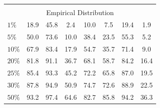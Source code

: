 \begin{center}
\begin{tabular*}{\textwidth}{@{\extracolsep{\fill}}lccccccc}
 \multicolumn{8}{c}{}\\ 
 \multicolumn{8}{c}{Empirical Distribution}\\ 
 \midrule 
$1\%$   & 18.9& 45.8& 2.4& 10.0& 7.5& 19.4& 1.9\\ 
$5\%$   & 50.0& 73.6& 10.0& 38.4& 23.5& 55.3& 5.2\\ 
$10\%$  & 67.9& 83.4& 17.9& 54.7& 35.7& 71.4& 9.0\\ 
$20\%$  & 81.8& 91.1& 36.7& 68.1& 58.7& 84.2& 16.4\\ 
$25\%$  & 85.4& 93.3& 45.2& 72.2& 65.8& 87.0& 19.5\\ 
$30\%$  & 87.8& 94.9& 50.9& 74.7& 72.6& 88.9& 22.5\\ 
$50\%$  & 93.2& 97.4& 64.6& 82.7& 85.8& 94.2& 36.3\\ 
\bottomrule 
\end{tabular*} 
\end{center}
